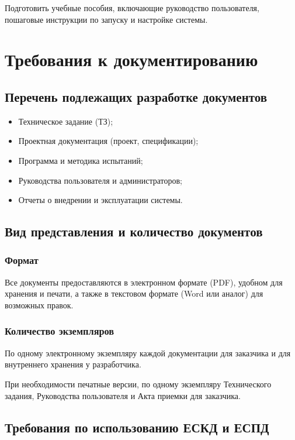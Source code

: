 Подготовить учебные пособия, включающие руководство пользователя,
пошаговые инструкции по запуску и настройке системы.

\section{Требования к документированию}

\subsection{Перечень подлежащих разработке документов}

\begin{itemize}
	\item Техническое задание (ТЗ);
	\item Проектная документация (проект, спецификации);
	\item Программа и методика испытаний;
	\item Руководства пользователя и администраторов;
	\item Отчеты о внедрении и эксплуатации системы.
\end{itemize}

\subsection{Вид представления и количество документов}

\subsubsection{Формат}

Все документы предоставляются в электронном формате (PDF),
удобном для хранения и печати,
а также в текстовом формате (Word или аналог) для возможных правок.

\subsubsection{Количество экземпляров}

По одному электронному экземпляру каждой документации
для заказчика и для внутреннего хранения у разработчика.

При необходимости печатные версии, по одному экземпляру Технического задания,
Руководства пользователя и Акта приемки для заказчика.

\subsection{Требования по использованию ЕСКД и ЕСПД}

